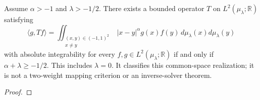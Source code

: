 \begin{theorem}
\label{thm:power-law-l2-classification}
\leanok
Assume $\alpha>-1$ and $\lambda>-1/2$.
There exists a bounded operator $T$ on $L^2(\mu_\lambda;\mathbb R)$ satisfying
\[
 \langle g,Tf\rangle=
 \iint_{\substack{(x,y)\in(-1,1)^2\\x\ne y}} |x-y|^\alpha g(x)f(y)\,d\mu_\lambda(x)d\mu_\lambda(y)
\]
with absolute integrability for every $f,g\in L^2(\mu_\lambda;\mathbb R)$
if and only if $\alpha+\lambda\ge-1/2$.
This includes $\lambda=0$. It classifies this common-space realization;
it is not a two-weight mapping criterion or an inverse-solver theorem.
\end{theorem}
\begin{proof}
\leanok
\end{proof}


